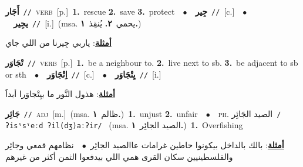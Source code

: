 \documentclass[10pt,a4paper,twoside]{article} %
\begin{document}
\begin{multicols}{2}
{\setlength\topsep{0pt}\textbf{\foreignlanguage{arabic}{أَجَار}}\ {\color{gray}\texttt{//}\color{black}}\ \textsc{verb}\ [p.]\ \textbf{1.}~rescue  \textbf{2.}~save  \textbf{3.}~protect\ \ $\bullet$\ \ \setlength\topsep{0pt}\textbf{\foreignlanguage{arabic}{جِير}}\ {\color{gray}\texttt{//}\color{black}}\ [c.]\ \ $\bullet$\ \ \setlength\topsep{0pt}\textbf{\foreignlanguage{arabic}{يجِير}}\ {\color{gray}\texttt{//}\color{black}}\ [i.]\ \color{gray}(msa. \foreignlanguage{arabic}{يحمي}~\foreignlanguage{arabic}{\textbf{٢.}}  \foreignlanguage{arabic}{يُنقِذ}~\foreignlanguage{arabic}{\textbf{١.}})\color{black}\  \begin{flushright}\color{gray}\foreignlanguage{arabic}{\textbf{\underline{\foreignlanguage{arabic}{أمثلة}}}: ياربي جِيرنا من اللي جاي}\end{flushright}\color{black}} \vspace{2mm}

{\setlength\topsep{0pt}\textbf{\foreignlanguage{arabic}{تْجَاوَر}}\ {\color{gray}\texttt{//}\color{black}}\ \textsc{verb}\ [p.]\ \textbf{1.}~be a neighbour to.  \textbf{2.}~live next to sb.  \textbf{3.}~be adjacent to sb or sth\ \ $\bullet$\ \ \setlength\topsep{0pt}\textbf{\foreignlanguage{arabic}{اِتْجَاوَر}}\ {\color{gray}\texttt{//}\color{black}}\ [c.]\ \ $\bullet$\ \ \setlength\topsep{0pt}\textbf{\foreignlanguage{arabic}{يِتْجَاوَر}}\ {\color{gray}\texttt{//}\color{black}}\ [i.]\  \begin{flushright}\color{gray}\foreignlanguage{arabic}{\textbf{\underline{\foreignlanguage{arabic}{أمثلة}}}: هذول النَّور ما بيِتْجاوَرا أبداََ}\end{flushright}\color{black}} \vspace{2mm}

{\setlength\topsep{0pt}\textbf{\foreignlanguage{arabic}{جَائِر}}\ {\color{gray}\texttt{//}\color{black}}\ \textsc{adj}\ [m.]\ \color{gray}(msa. \foreignlanguage{arabic}{ظالم}~\foreignlanguage{arabic}{\textbf{١.}})\color{black}\ \textbf{1.}~unjust  \textbf{2.}~unfair\ \ $\bullet$\ \ \textsc{ph.} \color{gray} \foreignlanguage{arabic}{الصيد الجَائِر}\color{black}\ {\color{gray}\texttt{/{\sffamily ʔisˤsˤeːd ʔil(dʒ)aːʔir}/}\color{black}}\ \color{gray} (msa. \foreignlanguage{arabic}{الصيد الجائِر}~\foreignlanguage{arabic}{\textbf{١.}})\color{black}\ \textbf{1.}~Overfishing\  \begin{flushright}\color{gray}\foreignlanguage{arabic}{\textbf{\underline{\foreignlanguage{arabic}{أمثلة}}}: بالك بالداخل بيكونوا حاطين غرامات عاالصيد الجائِر\ $\bullet$\ \  نظامهم قمعي وجائِر والفلسطينيين سكان القرى همي اللي بيدفعوا الثمن أكثر من غيرهم}\end{flushright}\color{black}} \vspace{2mm}


\end{multicols}
\end{document}
